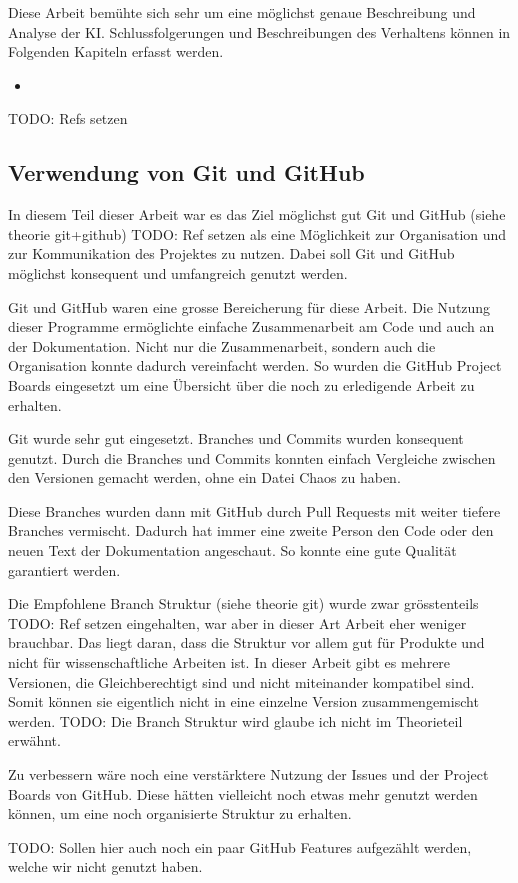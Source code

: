 Diese Arbeit bemühte sich sehr um eine möglichst genaue Beschreibung und Analyse
der KI. Schlussfolgerungen und Beschreibungen des Verhaltens können in Folgenden Kapiteln erfasst werden.

\begin{itemize}
    \item 
\end{itemize}
TODO: Refs setzen






\subsection*{Verwendung von Git und GitHub}
In diesem Teil dieser Arbeit war es das Ziel möglichst gut Git und GitHub (siehe
theorie git+github)  TODO: Ref setzen
als eine Möglichkeit zur Organisation und zur Kommunikation des Projektes zu
nutzen. Dabei soll Git und GitHub möglichst konsequent und umfangreich genutzt
werden.

Git und GitHub waren eine grosse Bereicherung für diese Arbeit. Die
Nutzung dieser Programme ermöglichte einfache Zusammenarbeit am Code und auch an
der Dokumentation. Nicht nur die Zusammenarbeit, sondern auch die Organisation
konnte dadurch vereinfacht werden. So wurden die GitHub Project Boards
eingesetzt um eine Übersicht über die noch zu erledigende Arbeit zu erhalten.

Git wurde sehr gut eingesetzt. Branches und Commits wurden konsequent genutzt.
Durch die Branches und Commits konnten einfach Vergleiche zwischen den Versionen
gemacht werden, ohne ein Datei Chaos zu haben.

Diese Branches wurden dann mit GitHub durch Pull Requests mit weiter tiefere
Branches vermischt. Dadurch hat immer eine zweite Person den Code oder den neuen
Text der Dokumentation angeschaut. So konnte eine gute Qualität garantiert
werden.

Die Empfohlene Branch Struktur (siehe theorie git) wurde zwar grösstenteils  TODO: Ref setzen
eingehalten, war aber in dieser Art Arbeit eher weniger brauchbar. Das liegt
daran, dass die Struktur vor allem gut für Produkte und nicht für
wissenschaftliche Arbeiten ist. In dieser Arbeit gibt es mehrere Versionen, die
Gleichberechtigt sind und nicht miteinander kompatibel sind. Somit können sie
eigentlich nicht in eine einzelne Version zusammengemischt werden.
TODO: Die Branch Struktur wird glaube ich nicht im Theorieteil erwähnt.

Zu verbessern wäre noch eine verstärktere Nutzung der Issues und der Project
Boards von GitHub. Diese hätten vielleicht noch etwas mehr genutzt werden
können, um eine noch organisierte Struktur zu erhalten.

TODO: Sollen hier auch noch ein paar GitHub Features aufgezählt werden, welche wir nicht genutzt haben.





